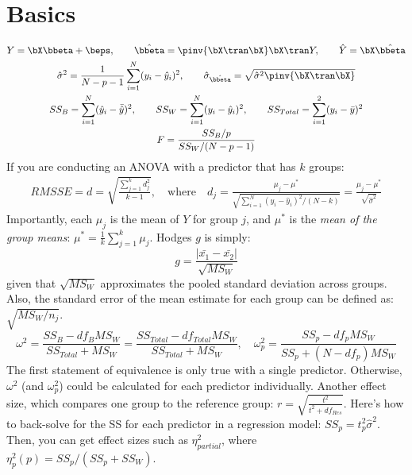 \chapter{Basics}
\label{app:K}
\begin{gather}
    Y = \bX\bbeta + \beps, \quad\quad \hat{\bbeta} = \pinv{\bX\tran\bX}\bX\tran Y, \quad\quad \hat{Y} = \bX\hat{\bbeta} \\
    \hat{\sigma}^2 = \frac{1}{N-p-1} \sum_{i=1}^N (y_i - \hat{y}_i)^2, \quad\quad \hat{\sigma}_{\hat{\bbeta}} = \sqrt{\hat{\sigma}^2 \pinv{\bX\tran\bX}} \\
    SS_B = \sum_{i=1}^N (\hat{y}_i - \bar{\hat{y}})^2, \quad\quad SS_W = \sum_{i=1}^N (y_i - \hat{y}_i)^2, \quad\quad SS_{Total} = \sum_{i=1}^2 (y_i - \bar{y})^2 \\
    F = \frac{SS_B/p}{SS_W/(N-p-1)}
\end{gather}
If you are conducting an ANOVA with a predictor that has $k$ groups:
\begin{gather}
    RMSSE = d = \sqrt{\frac{\sum_{j=1}^k d_j^2}{k - 1}}, \quad\text{where}\quad d_j = \frac{\mu_j - \mu^*}{\sqrt{\sum_{i=1}^N (y_i - \hat{y}_i)^2 /(N - k)}} = \frac{\mu_j - \mu^*}{\sqrt{\hat{\sigma}^2}}
\end{gather}
Importantly, each $\mu_j$ is the mean of $Y$ for group $j$, and $\mu^*$ is the \textit{mean of the group means}: $\mu^* = \frac{1}{k}\sum_{j=1}^k \mu_j$. Hodges $g$ is simply:
\begin{equation}
    g = \frac{|\bar{x_1} - \bar{x_2}|}{\sqrt{MS_W}}
\end{equation}
given that $\sqrt{MS_W}$ approximates the pooled standard deviation across groups. Also, the standard error of the mean estimate for each group can be defined as: $\sqrt{MS_W/n_j}$.
\begin{equation}
    \omega^2 = \frac{SS_B - df_B MS_W}{SS_{Total} + MS_W} = \frac{SS_{Total} - df_{Total} MS_W}{SS_{Total} + MS_W}, \quad \omega_p^2 = \frac{SS_p - df_p MS_W}{SS_p + (N - df_p) MS_W}
\end{equation}
The first statement of equivalence is only true with a single predictor. Otherwise, $\omega^2$ (and $\omega_p^2$) could be calculated for each predictor individually. Another effect size, which compares one group to the reference group: $r = \sqrt{\frac{t^2}{t^2 + df_{Res}}}$. Here's how to back-solve for the SS for each predictor in a regression model: $SS_p = t_p^2 \hat{\sigma}^2$. Then, you can get effect sizes such as $\eta_{partial}^2$, where $\eta_p^2(p) = SS_p/(SS_p + SS_W)$.

